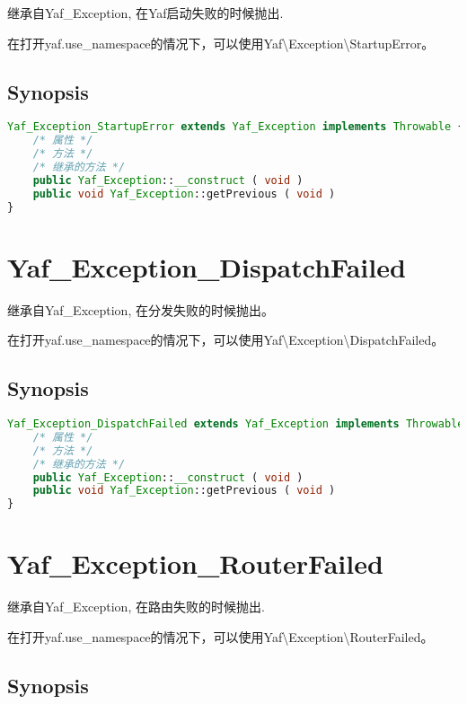 继承自Yaf\_Exception, 在Yaf启动失败的时候抛出.

在打开yaf.use\_namespace的情况下，可以使用Yaf\textbackslash Exception\textbackslash StartupError。



\section{Synopsis}


\begin{lstlisting}[language=PHP]
Yaf_Exception_StartupError extends Yaf_Exception implements Throwable {
    /* 属性 */
    /* 方法 */
    /* 继承的方法 */
    public Yaf_Exception::__construct ( void )
    public void Yaf_Exception::getPrevious ( void )
}
\end{lstlisting}


\chapter{Yaf\_Exception\_DispatchFailed}

继承自Yaf\_Exception, 在分发失败的时候抛出。

在打开yaf.use\_namespace的情况下，可以使用Yaf\textbackslash Exception\textbackslash DispatchFailed。

\section{Synopsis}


\begin{lstlisting}[language=PHP]
Yaf_Exception_DispatchFailed extends Yaf_Exception implements Throwable {
    /* 属性 */
    /* 方法 */
    /* 继承的方法 */
    public Yaf_Exception::__construct ( void )
    public void Yaf_Exception::getPrevious ( void )
}
\end{lstlisting}

\chapter{Yaf\_Exception\_RouterFailed}

继承自Yaf\_Exception, 在路由失败的时候抛出.

在打开yaf.use\_namespace的情况下，可以使用Yaf\textbackslash Exception\textbackslash RouterFailed。

\section{Synopsis}

